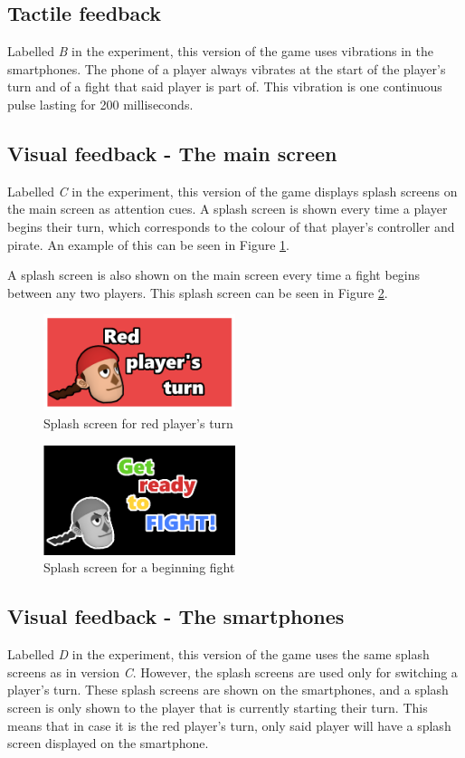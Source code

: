 \subsection{Tactile feedback}\label{sub:tactile_feedback}
Labelled \textit{B} in the experiment, this version of the game uses vibrations in the smartphones. The phone of a player always vibrates at the start of the player's turn and of a fight that said player is part of. This vibration is one continuous pulse lasting for 200 milliseconds.

\subsection{Visual feedback - The main screen}\label{sub:visual_main}
Labelled \textit{C} in the experiment, this version of the game displays splash screens on the main screen as attention cues. A splash screen is shown every time a player begins their turn, which corresponds to the colour of that player's controller and pirate. An example of this can be seen in Figure \ref{fig:redturn}.

A splash screen is also shown on the main screen every time a fight begins between any two players. This splash screen can be seen in Figure \ref{fig:fight_splash}.

\begin{figure}[h!]
	\centering
	\includegraphics[width=0.5\textwidth]{figures/redturn.png}
	\caption{Splash screen for red player's turn}\label{fig:redturn}
\end{figure}

\begin{figure}[h!]
	\centering
	\includegraphics[width=0.5\textwidth]{figures/getready.png}
	\caption{Splash screen for a beginning fight}\label{fig:fight_splash}
\end{figure}

\subsection{Visual feedback - The smartphones}\label{sub:visual_smartphone}
Labelled \textit{D} in the experiment, this version of the game uses the same splash screens as in version \textit{C}. However, the splash screens are used only for switching a player's turn. These splash screens are shown on the smartphones, and a splash screen is only shown to the player that is currently starting their turn. This means that in case it is the red player's turn, only said player will have a splash screen displayed on the smartphone.